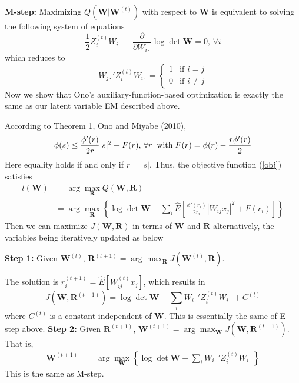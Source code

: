 \documentclass[11pt]{article}%
\begin{document}
\vspace{0.1in}
\noindent  \textbf{M-step:} 
	Maximizing $Q(\bm W | \bm W^{(t)})$ with respect to $\bm W$ is equivalent to solving the following system of equations 
	\begin{equation}
		\frac{1}{2}Z_i^{(t)} W_{i\cdot} - \frac{\partial}{\partial W_{i\cdot}} \log \det \bm W = 0, \, \forall i
	\end{equation}
	which reduces to
	\begin{equation}
		W_{j\cdot}' Z_i^{(t)} W_{i\cdot} = \begin{cases}
			1 &\text{if } i=j\\
			0 &\text{if } i\neq j
		\end{cases}
	\end{equation}
Now we show that Ono's auxiliary-function-based optimization is exactly the same as our latent variable EM described above. 

According to Theorem 1, Ono and Miyabe (2010),
\begin{equation}
	\phi(s) \leq \frac{\phi'(r)}{2r}|s|^2 + F(r), \, \forall r  \; \; {\rm with} \; F(r) = \phi(r) - \frac{r\phi'(r)}{2}
\end{equation}
Here equality holds if and only if $r = |s|$. Thus, the objective function (\ref{obj}) satisfies
\begin{align}
	l(\bm W) &= \arg\max_{\bm R} Q(\bm W, \bm R)\\
	&=\arg\max_{\bm R}  \left\{ \log\det \bm W - \sum_i\hat{E}\left[ \frac{\phi'(r_i)}{2r_i}|W_{ij}x_j|^2 + F(r_i)\right]\right\}
\end{align}
Then we can maximize $J(\bm W, \bm R)$ in terms of $\bm W$ and $\bm R$ alternatively, the variables being iteratively updated as below

\vspace{0.15in}

	\noindent  \textbf{Step 1:}
	Given $\bm W^{(t)}$,
	$\bm R^{(t+1)} = \arg\max_{\bm R} J(\bm W^{(t)}, \bm R)$. 
	
	The solution is $r_i^{(t+1)} = \hat{E}\left[W_{ij}^{(t)} x_j\right]$, which results in
	\begin{equation}
		J(\bm W,  \bm R^{(t+1)})  =  \log\det \bm W - \sum_i W_{i\cdot}'Z_i^{(t)}W_{i\cdot} + C^{(t)}
	\end{equation} 
	where $C^{(t)}$ is a constant independent of $\bm W$. This is essentially the same of E-step above.
	\noindent  \textbf{Step 2:} 
	Given $\bm R^{(t+1)}$,  $\bm W^{(t+1)} = \arg\max_{\bm W} J(\bm W, \bm R^{(t+1)})
	$. That is,
	\begin{align}
		\bm{W}^{(t+1)}
		&= \arg\max_{\bm W} \left\{\log\det \bm W - \sum_i W_{i\cdot}'Z_i^{(t)}W_{i\cdot}\right\}
	\end{align}
	This is the same as M-step.
\end{document}
